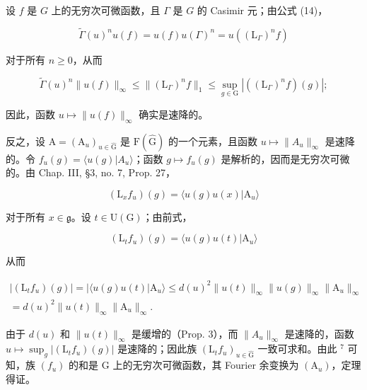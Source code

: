 设 \(f\) 是 \(G\) 上的无穷次可微函数，且 \(\Gamma\) 是 \(G\) 的 Casimir 元；由公式 (14)，

\[
\tilde {\Gamma} (u) ^ {n} u (f) = u (f) u (\Gamma) ^ {n} = u ((\mathrm{L} _ {\Gamma}) ^ {n} f)
\]

对于所有 \(n \geq 0\)，从而

\[
\tilde {\Gamma} (u) ^ {n} \| u (f) \| _ {\infty} \leq \| (\mathrm{L} _ {\Gamma}) ^ {n} f \| _ {1} \leq \sup _ {g \in \mathrm{G}} | ((\mathrm{L} _ {\Gamma}) ^ {n} f) (g) |;\tag{15}
\]

因此，函数 \(u \mapsto \|u(f)\|_{\infty}\) 确实是速降的。

反之，设 \(\mathrm{A} = (\mathrm{A}_{u})_{u \in \hat{\mathrm{G}}}\) 是 \(\mathrm{F}(\hat{\mathrm{G}})\) 的一个元素，且函数 \(u \mapsto \|A_{u}\|_{\infty}\) 是速降的。令 \(f_{u}(g) = \langle u(g)|A_{u} \rangle\)；函数 \(g \mapsto f_{u}(g)\) 是解析的，因而是无穷次可微的。由 Chap. III, §3, no. 7, Prop. 27，

\[
(\mathrm{L} _ {x} f _ {u}) (g) = \langle u (g) u (x) | \mathrm{A} _ {u} \rangle
\]

对于所有 \(x \in \mathfrak{g}\)。设 \(t \in \mathrm{U}(\mathrm{G})\)；由前式，

\[
(\mathrm{L} _ {t} f _ {u}) (g) = \langle u (g) u (t) | \mathrm{A} _ {u} \rangle
\]

从而

\[
\begin{array}{r} | (\mathrm{L} _ {t} f _ {u}) (g) | = | \langle u (g) u (t) | \mathrm{A} _ {u} \rangle \leq d (u) ^ {2} \| u (t) \| _ {\infty} \| u (g) \| _ {\infty} \| \mathrm{A} _ {u} \| _ {\infty} \\ = d (u) ^ {2} \| u (t) \| _ {\infty} \| \mathrm{A} _ {u} \| _ {\infty}. \end{array}
\]

由于 \(d(u)\) 和 \(\|u(t)\|_{\infty}\) 是缓增的（Prop. 3），而 \(\|A_{u}\|_{\infty}\) 是速降的，函数 \(u \mapsto \sup_{g} |(\mathrm{L}_{t}f_{u})(g)|\) 是速降的；因此族 \((\mathrm{L}_{t}f_{u})_{u \in \hat{\mathrm{G}}}\) 一致可求和。由此 \(^{7}\) 可知，族 \((f_{u})\) 的和是 G 上的无穷次可微函数，其 Fourier 余变换为 \((\mathrm{A}_{u})\)，定理得证。

